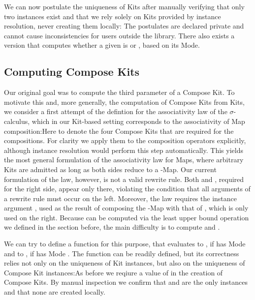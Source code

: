 \documentclass[screen,nonacm]{acmart}
\begin{document}
We can now postulate the uniqueness of Kits after manually verifying that only
two instances exist and that we rely solely on Kits provided by instance
resolution, never creating them locally: \AUniqueKits{}The postulates are
declared private and cannot cause inconsistencies for users outside the
library. There also exists a version  that computes
whether a given  is  or , based on
its Mode.

\subsection{Computing Compose Kits}\label{sec:ags-cck}
Our original goal was to compute the third parameter of a Compose Kit. To
motivate this and, more generally, the computation of Compose Kits from Kits,
we consider a first attempt of the defintion for the associativity law of the
$σ$-calculus, which in our Kit-based setting corresponds to the associativity
of Map composition:\AAssocTryO{}Here  to  denote
the four Compose Kits that are required for the compositions. For clarity we
apply them to the composition operators explicitly, although instance
resolution would perform this step automatically. This yields the most general
formulation of the associativity law for Maps, where arbitrary Kits are
admitted as long as both sides reduce to a -Map. Our current
formulation of the law, however, is not a valid rewrite rule. Both
 and , required for the right side, appear only
there, violating the condition that all arguments of a rewrite rule must occur
on the left. Moreover, the law requires the instance argument ,
used as the result of composing the -Map with that of
, which is only used on the right. Because  can be
computed via the least upper bound operation we defined in the section before,
the main difficulty is to compute  and .

We can try to define a function \ACompCKitSafe{} for this purpose, that
evaluates to , if  has Mode
 and to , if  has
Mode . The function can be readily defined, but
its correctness relies not only on the uniqueness of Kit instances, but also on
the uniqueness of Compose Kit instances:\AUniqueCKits{}As before we reqiure a
value of  in the creation of Compose Kits. By manual
inspection we confirm that  and  are the only
instances and that none are created locally.
\end{document}
